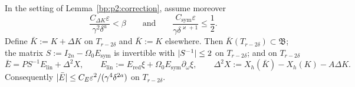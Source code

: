 \begin{lemma}\label{bp:p2:newton-error}
In the setting of Lemma~\ref{bp:p2:correction}, assume moreover
\[
\frac{C_{\Delta K}\varepsilon}{\gamma^2\delta^a}<\beta\qquad\text{and}\qquad
\frac{C_{\mathrm{sym}}\varepsilon}{\gamma\delta^{\varkappa+1}}\le\frac12.
\]
Define $\bar K:=K+\Delta K$ on $T_{r-2\delta}$ and $\bar K:=K$ elsewhere. Then $\bar
K(T_{r-2\delta})\subset\mathfrak B$; the matrix $S:=I_{2n}-\Omega_0E_{\mathrm{sym}}$ is invertible with
$\lvert S^{-1}\rvert\le2$ on $T_{r-2\delta}$; and on $T_{r-2\delta}$
\[
\bar E=PS^{-1}E_{\mathrm{lin}}+\Delta^2X,\qquad E_{\mathrm{lin}}:=E_{\mathrm{red}}\xi+\Omega_0
E_{\mathrm{sym}}\partial_\omega\xi,\qquad\Delta^2X:=X_h(\bar K)-X_h(K)-A\Delta K.
\]
Consequently $\lvert \bar E\rvert\le C_E\varepsilon^2/(\gamma^4\delta^{2a})$ on $T_{r-2\delta}$.
\end{lemma}

